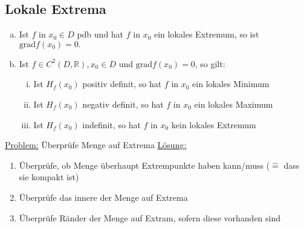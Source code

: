 \subsection{Lokale Extrema}
\begin{enumerate} [a)]
    \item Ist $f$ in $x_0 \in D$ pdb und hat $f$ in $x_0$ ein lokales Extremum, so ist $\text{grad}f(x_0) = 0.$
    \item Ist $f \in C^2(D,\mathbb{R}), x_0 \in D$ und $\text{grad}f(x_0) = 0$, so gilt:
    \begin{enumerate} [i)]
        \item Ist $H_f(x_0)$ positiv definit, so hat $f$ in $x_0$ ein lokales Minimum
        \item Ist $H_f(x_0)$ negativ definit, so hat $f$ in $x_0$ ein lokales Maximum
        \item Ist $H_f(x_0)$ indefinit, so hat $f$ in $x_0$ kein lokales Extremum
    \end{enumerate}
\end{enumerate}
\underline{Problem:} Überprüfe Menge auf Extrema
\underline{Lösung:} 
\begin{enumerate}
    \item Überprüfe, ob Menge überhaupt Extrempunkte haben kann/muss ($\widehat{=}$ dass sie kompakt ist)
    \item Überprüfe das innere der Menge auf Extrema
    \item Überprüfe Ränder der Menge auf Extram, sofern diese vorhanden sind
\end{enumerate}